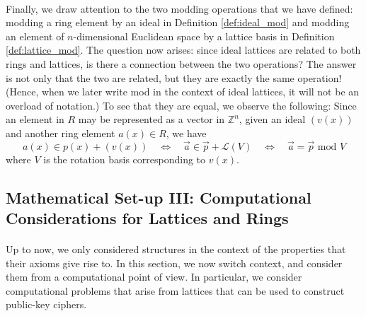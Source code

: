 \documentclass{article}
\theoremstyle{definition}
\theoremstyle{example}
\renewcommand{\L}{\mathcal{L}}
\newcommand{\Int}{\mathbb{Z}}
\renewcommand{\mod}{\,\,\text{mod}\,\,}
\begin{document}
\paragraph{} Finally, we draw attention to the two modding operations that we
have defined: modding a ring element by an ideal in Definition
\ref{def:ideal_mod} and modding an element of $n$-dimensional Euclidean space by
a lattice basis in Definition \ref{def:lattice_mod}. The question now arises: since ideal
lattices are related to both rings and lattices, is there a connection between
the two operations? The answer is not only that the two are related, but they
are exactly the same operation! (Hence, when we later write mod in the context of
ideal lattices, it will not be an overload of notation.) To see that they are
equal, we observe the following: Since an element in $R$ may be represented as a
vector in $\Int^n$, given an ideal $(v(x))$ and another ring element $a(x) \in
R$, we have
\[
  a(x) \in p(x) + (v(x)) \quad\Leftrightarrow\quad \vec{a} \in \vec{p} + \L(V)
  \quad\Leftrightarrow\quad \vec{a} = \vec{p} \mod V
\]
where $V$ is the rotation basis corresponding to $v(x)$.
\subsection{Mathematical Set-up III: Computational Considerations for Lattices and Rings}
\paragraph{} Up to now, we only considered structures in the context of the
properties that their axioms give rise to. In this section, we now switch
context, and consider them from a computational point of view. In particular,
we consider computational problems that arise from lattices that can be used to
construct public-key ciphers.
\end{document}
